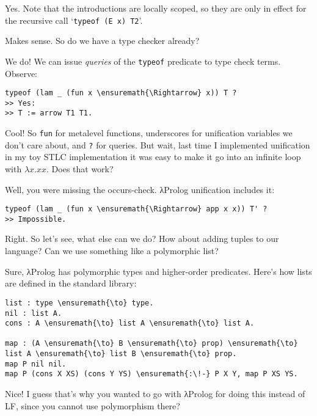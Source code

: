 \heroADVISOR{} Yes. Note that the introductions are locally scoped, so they
are only in effect for the recursive call `\texttt{typeof\ (E\ x)\ T2}'.

\heroSTUDENT{} Makes sense. So do we have a type checker already?

\heroADVISOR{} We do! We can issue \emph{queries} of the \texttt{typeof}
predicate to type check terms. Observe:

\importantCodeblock{}

\begin{verbatim}
typeof (lam _ (fun x \ensuremath{\Rightarrow} x)) T ?
>> Yes:
>> T := arrow T1 T1.
\end{verbatim}

\importantCodeblockEnd{}

\heroSTUDENT{} Cool! So \texttt{fun} for metalevel functions, underscores for
unification variables we don't care about, and \texttt{?} for queries.
But wait, last time I implemented unification in my toy STLC
implementation it was easy to make it go into an infinite loop with
\(\lambda x. x x\). Does that work?

\heroADVISOR{} Well, you were missing the occurs-check. \foreignlanguage{greek}{λ}Prolog unification
includes it:

\begin{verbatim}
typeof (lam _ (fun x \ensuremath{\Rightarrow} app x x)) T' ?
>> Impossible.
\end{verbatim}

\heroSTUDENT{} Right. So let's see, what else can we do? How about adding
tuples to our language? Can we use something like a polymorphic list?

\heroADVISOR{} Sure, \foreignlanguage{greek}{λ}Prolog has polymorphic types and higher-order
predicates. Here's how lists are defined in the standard library:

\begin{verbatim}
list : type \ensuremath{\to} type.
nil : list A.
cons : A \ensuremath{\to} list A \ensuremath{\to} list A.

map : (A \ensuremath{\to} B \ensuremath{\to} prop) \ensuremath{\to} list A \ensuremath{\to} list B \ensuremath{\to} prop.
map P nil nil.
map P (cons X XS) (cons Y YS) \ensuremath{:\!-} P X Y, map P XS YS.
\end{verbatim}

\heroSTUDENT{} Nice! I guess that's why you wanted to go with \foreignlanguage{greek}{λ}Prolog for
doing this instead of LF, since you cannot use polymorphism there?

